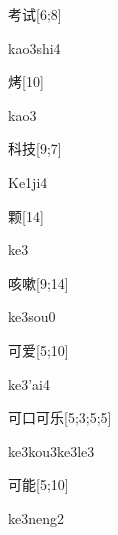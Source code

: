 \begin{verbete}{考试}[6;8]
\begin{pronuncia}{kao3shi4}
\end{pronuncia}
\end{verbete}

\begin{verbete}[kao3]{烤}[10]
\begin{pronuncia}{kao3}
\end{pronuncia}
\end{verbete}

\begin{verbete}[Ke1ji4]{科技}[9;7]
\begin{pronuncia}{Ke1ji4}
\end{pronuncia}
\end{verbete}

\begin{verbete}[ke3]{颗}[14]
\begin{pronuncia}{ke3}
\end{pronuncia}
\end{verbete}

\begin{verbete}[ke3sou0]{咳嗽}[9;14]
\begin{pronuncia}{ke3sou0}
\end{pronuncia}
\end{verbete}

\begin{verbete}[ke3'ai4]{可爱}[5;10]
\begin{pronuncia}{ke3'ai4}
\end{pronuncia}
\end{verbete}

\begin{verbete}[ke3kou3ke3le3]{可口可乐}[5;3;5;5]
\begin{pronuncia}[\\]{ke3kou3ke3le3}
\end{pronuncia}
\end{verbete}

\begin{verbete}[ke3neng2]{可能}[5;10]
\begin{pronuncia}{ke3neng2}
\end{pronuncia}
\end{verbete}

